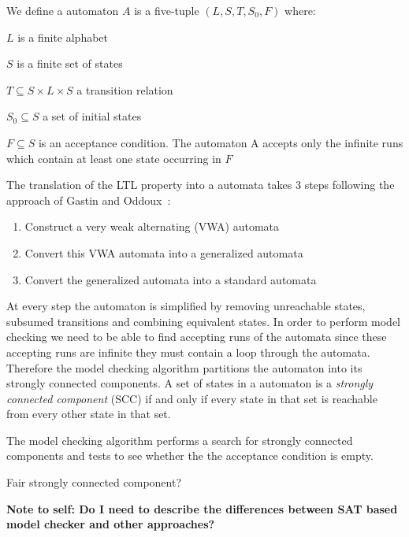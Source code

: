 \begin{mydef}
We define a \Buchi automaton $A$ is a five-tuple $(L, S,T,S_0, F)$ where:
\item $L$ is a finite alphabet
\item $S$ is a finite set of states
\item $T \subseteq S \times L \times S$ a transition relation
\item $S_0 \subseteq S$ a set of initial states 
\item $F \subseteq S$ is an acceptance condition. The automaton A accepts only the infinite runs which contain at least one state occurring in $F$
\end{mydef}

The translation of the LTL property into a \Buchi automata takes 3 steps following the approach of Gastin and Oddoux~\cite{PG01}:

\begin{enumerate}
\item Construct a very weak alternating (VWA) automata
\item Convert this VWA automata into a generalized \Buchi automata
\item Convert the generalized \Buchi automata into a standard \Buchi automata
\end{enumerate}

At every step the automaton is simplified by removing unreachable states, subsumed transitions and combining equivalent states. In order to perform model checking we need to be able to find accepting runs of the automata since these accepting runs are infinite they must contain a loop through the automata. Therefore the model checking algorithm partitions the \Buchi automaton into its strongly connected components. A set of states in a \Buchi automaton is a \emph{strongly connected component} (SCC) if and only if every state in that set is reachable from every other state in that set. 

The model checking algorithm performs a search for strongly connected components and tests to see whether the the acceptance condition is empty.

Fair strongly connected component?



\textbf{Note to self: Do I need to describe the differences between SAT based model checker and other approaches?}
